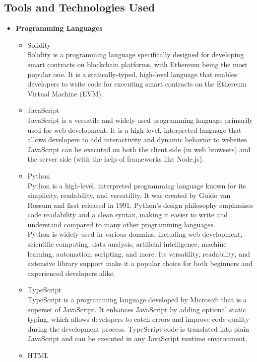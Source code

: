 \documentclass[oneside, 12pt]{book}
\begin{document}
		\subsection{Tools and Technologies Used}
			\begin{itemize}
				\item\textbf{Programming Languages}
					\begin{itemize}
						\item Solidity
							\\Solidity is a programming language specifically designed for developing smart contracts on blockchain platforms, with Ethereum being the most popular one. It is a statically-typed, high-level language that enables developers to write code for executing smart contracts on the Ethereum Virtual Machine (EVM).
						\item JavaScript
							\\JavaScript is a versatile and widely-used programming language primarily used for web development. It is a high-level, interpreted language that allows developers to add interactivity and dynamic behavior to websites. JavaScript can be executed on both the client side (in web browsers) and the server side (with the help of frameworks like Node.js).
						\item Python
							\\Python is a high-level, interpreted programming language known for its simplicity, readability, and versatility. It was created by Guido van Rossum and first released in 1991. Python's design philosophy emphasizes code readability and a clean syntax, making it easier to write and understand compared to many other programming languages.
							\\Python is widely used in various domains, including web development, scientific computing, data analysis, artificial intelligence, machine learning, automation, scripting, and more. Its versatility, readability, and extensive library support make it a popular choice for both beginners and experienced developers alike.
						\item TypeScript
							\\TypeScript is a programming language developed by Microsoft that is a superset of JavaScript. It enhances JavaScript by adding optional static typing, which allows developers to catch errors and improve code quality during the development process. TypeScript code is translated into plain JavaScript and can be executed in any JavaScript runtime environment.
						\item HTML

\end{itemize}
\end{itemize}
\end{document}
